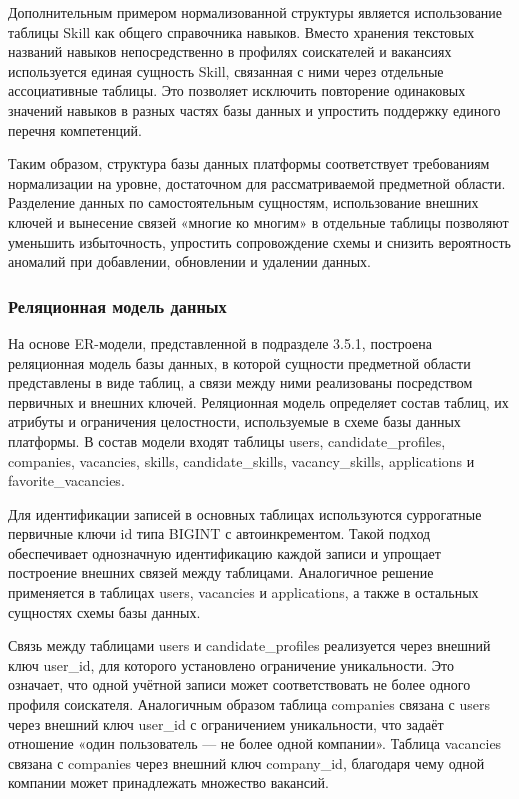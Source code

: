 Дополнительным примером нормализованной структуры является использование таблицы Skill как общего справочника навыков. Вместо хранения текстовых названий навыков непосредственно в профилях соискателей и вакансиях используется единая сущность Skill, связанная с ними через отдельные ассоциативные таблицы. Это позволяет исключить повторение одинаковых значений навыков в разных частях базы данных и упростить поддержку единого перечня компетенций.

Таким образом, структура базы данных платформы соответствует требованиям нормализации на уровне, достаточном для рассматриваемой предметной области. Разделение данных по самостоятельным сущностям, использование внешних ключей и вынесение связей «многие ко многим» в отдельные таблицы позволяют уменьшить избыточность, упростить сопровождение схемы и снизить вероятность аномалий при добавлении, обновлении и удалении данных.

\subsubsection{Реляционная модель данных}

На основе ER-модели, представленной в подразделе 3.5.1, построена реляционная модель базы данных, в которой сущности предметной области представлены в виде таблиц, а связи между ними реализованы посредством первичных и внешних ключей. Реляционная модель определяет состав таблиц, их атрибуты и ограничения целостности, используемые в схеме базы данных платформы. В состав модели входят таблицы users, candidate\_profiles, companies, vacancies, skills, candidate\_skills, vacancy\_skills, applications и favorite\_vacancies.

Для идентификации записей в основных таблицах используются суррогатные первичные ключи id типа BIGINT с автоинкрементом. Такой подход обеспечивает однозначную идентификацию каждой записи и упрощает построение внешних связей между таблицами. Аналогичное решение применяется в таблицах users, vacancies и applications, а также в остальных сущностях схемы базы данных.

Связь между таблицами users и candidate\_profiles реализуется через внешний ключ user\_id, для которого установлено ограничение уникальности. Это означает, что одной учётной записи может соответствовать не более одного профиля соискателя. Аналогичным образом таблица companies связана с users через внешний ключ user\_id с ограничением уникальности, что задаёт отношение «один пользователь — не более одной компании». Таблица vacancies связана с companies через внешний ключ company\_id, благодаря чему одной компании может принадлежать множество вакансий.


